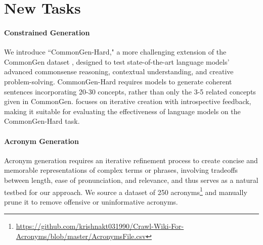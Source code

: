 
\section{New Tasks}
\label{sec:newtasks}
\paragraph{Constrained Generation}
We introduce ``CommonGen-Hard," a more challenging extension of the CommonGen dataset \cite{lin2019commongen}, designed to test state-of-the-art language models' advanced commonsense reasoning, contextual understanding, and creative problem-solving. CommonGen-Hard requires models to generate coherent sentences incorporating 20-30 concepts, rather than only the 3-5 related concepts given in CommonGen. 
\ours focuses on iterative creation with introspective feedback, making it suitable for evaluating the effectiveness of language models on the CommonGen-Hard task.

\paragraph{Acronym Generation}

Acronym generation requires an iterative refinement process to create concise and memorable representations of complex terms or phrases, involving tradeoffs between length, ease of pronunciation, and relevance, and thus serves as a natural testbed for our approach. We source a dataset of 250 acronyms\footnote{\scriptsize{\url{https://github.com/krishnakt031990/Crawl-Wiki-For-Acronyms/blob/master/AcronymsFile.csv}}} and manually prune it to remove offensive or uninformative acronyms.
